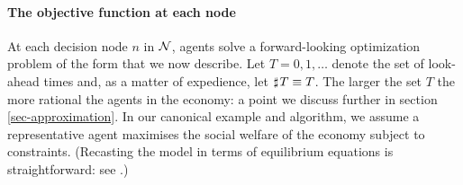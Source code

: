 \documentclass[12pt,a4paper,twoside, draft]{article}
\newcommand{\countof}{\mathbin{\sharp}\hskip1pt}
\begin{document}
\paragraph{The objective function at each node}
At each decision node $n$ in $\mathcal N$, agents solve a forward-looking
optimization problem of the form that we now describe.
Let $T = 0, 1, \dots$ denote the set of look-ahead times and, as a matter of
expedience, let $\countof T \equiv T$.
The larger the set $T$ the more rational the agents in the economy: a point we
discuss further in section \ref{sec-approximation}.
In our canonical example and algorithm, we assume
a representative agent maximises the social welfare of the economy subject to
constraints.
(Recasting the model in terms of equilibrium equations is straightforward:
see \citet[Algorithm 2]{CJ}.)
\end{document}
